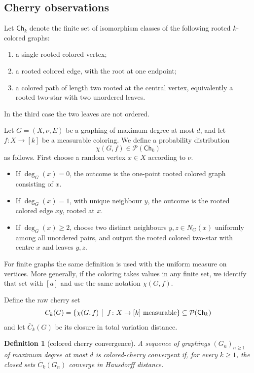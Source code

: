 \documentclass[11pt]{amsart}
\newcommand{\calP}{\mathcal P}
\newtheorem{definition}[theorem]{Definition}
\theoremstyle{remark}
\begin{document}
\subsection{Cherry observations}

Let $\mathsf{Ch}_k$ denote the finite set of isomorphism classes of the following rooted $k$-colored graphs:
\begin{enumerate}[label=(\roman*)]
 \item a single rooted colored vertex;
 \item a rooted colored edge, with the root at one endpoint;
 \item a colored path of length two rooted at the central vertex, equivalently a rooted two-star with two unordered leaves.
\end{enumerate}
In the third case the two leaves are not ordered.

Let $G=(X,\nu,E)$ be a graphing of maximum degree at most $d$, and let $f\colon X\to[k]$ be a measurable coloring. We define a probability distribution
\[
 \chi(G,f)\in\calP(\mathsf{Ch}_k)
\]
as follows. First choose a random vertex $x\in X$ according to $\nu$.
\begin{itemize}
 \item If $\deg_G(x)=0$, the outcome is the one-point rooted colored graph consisting of $x$.
 \item If $\deg_G(x)=1$, with unique neighbour $y$, the outcome is the rooted colored edge $xy$, rooted at $x$.
 \item If $\deg_G(x)\geq 2$, choose two distinct neighbours $y,z\in N_G(x)$ uniformly among all unordered pairs, and output the rooted colored two-star with centre $x$ and leaves $y,z$.
\end{itemize}
For finite graphs the same definition is used with the uniform measure on vertices.  More generally, if the coloring takes values in any finite set, we identify that set with $[a]$ and use the same notation $\chi(G,f)$.

Define the raw cherry set
\[
 C_k(G)=\{\chi(G,f)\,\bigm|\, f\colon X\to[k]\text{ measurable}\}\subseteq\calP(\mathsf{Ch}_k)
\]
and let $\overline C_k(G)$ be its closure in total variation distance.

\begin{definition}[colored cherry convergence]
A sequence of graphings $(G_n)_{n\geq 1}$ of maximum degree at most $d$ is \emph{colored-cherry convergent} if, for every $k\geq 1$, the closed sets $\overline C_k(G_n)$ converge in Hausdorff distance.
\end{definition}
\end{document}
